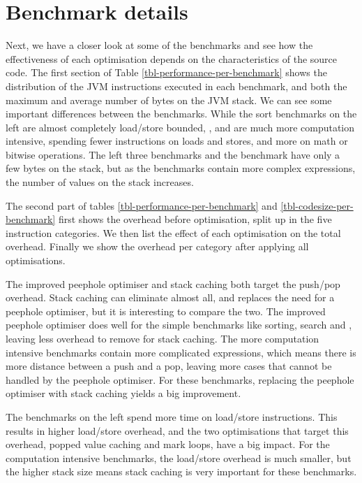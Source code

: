 \section{Benchmark details}
\label{sec-evaluation-benchmark-details}
Next, we have a closer look at some of the benchmarks and see how the effectiveness of each optimisation depends on the characteristics of the source code. The first section of Table \ref{tbl-performance-per-benchmark} shows the distribution of the JVM instructions executed in each benchmark, and both the maximum and average number of bytes on the JVM stack. We can see some important differences between the benchmarks. While the sort benchmarks on the left are almost completely load/store bounded, ,  and  are much more computation intensive, spending fewer instructions on loads and stores, and more on math or bitwise operations. The left three benchmarks and the  benchmark have only a few bytes on the stack, but as the benchmarks contain more complex expressions, the number of values on the stack increases.

The second part of tables \ref{tbl-performance-per-benchmark} and \ref{tbl-codesize-per-benchmark} first shows the overhead before optimisation, split up in the five instruction categories. We then list the effect of each optimisation on the total overhead. Finally we show the overhead per category after applying all optimisations.

The improved peephole optimiser and stack caching both target the push/pop overhead. Stack caching can eliminate almost all, and replaces the need for a peephole optimiser, but it is interesting to compare the two. The improved peephole optimiser does well for the simple benchmarks like sorting,  search and , leaving less overhead to remove for stack caching. The more computation intensive benchmarks contain more complicated expressions, which means there is more distance between a push and a pop, leaving more cases that cannot be handled by the peephole optimiser. For these benchmarks, replacing the peephole optimiser with stack caching yields a big improvement.

The benchmarks on the left spend more time on load/store instructions. This results in higher load/store overhead, and the two optimisations that target this overhead, popped value caching and mark loops, have a big impact. For the computation intensive benchmarks, the load/store overhead is much smaller, but the higher stack size means stack caching is very important for these benchmarks.

